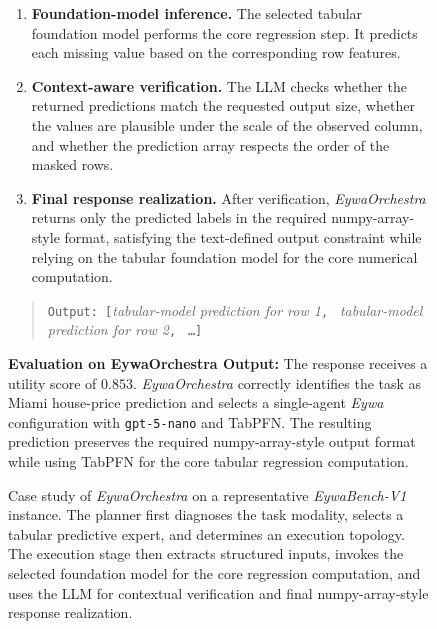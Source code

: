 \documentclass{llmxive}
\begin{document}
{\begin{figure}[!htbp]
{\begin{tcolorbox}[colback=gray!5!white, colframe=pink!90, 
title=Case Study B.1: EywaOrchestra Example 1, boxrule=0.3mm, width=1.2\textwidth, arc=2mm, auto outer arc=true]
\begin{enumerate}
    \item \textbf{Foundation-model inference.}
    The selected tabular foundation model performs the core regression step. It predicts each missing value based on the corresponding row features.

    \item \textbf{Context-aware verification.}
    The LLM checks whether the returned predictions match the requested output size, whether the values are plausible under the scale of the observed column, and whether the prediction array respects the order of the masked rows.

    \item \textbf{Final response realization.}
    After verification, \textit{EywaOrchestra} returns only the predicted labels in the required numpy-array-style format, satisfying the text-defined output constraint while relying on the tabular foundation model for the core numerical computation.
\end{enumerate}

\begin{quote}
\small
\texttt{Output: [}\textit{tabular-model prediction for row 1}\texttt{, }
\textit{tabular-model prediction for row 2}\texttt{, }
\texttt{\ldots}\texttt{]}
\end{quote}

\textbf{Evaluation on EywaOrchestra Output:}
The response receives a utility score of \(0.853\). \textit{EywaOrchestra} correctly identifies the task as Miami house-price prediction and selects a single-agent \textit{Eywa} configuration with \texttt{gpt-5-nano} and TabPFN. The resulting prediction preserves the required numpy-array-style output format while using TabPFN for the core tabular regression computation.


\end{tcolorbox}}
\caption{
Case study of \textit{EywaOrchestra} on a representative \textit{EywaBench-V1} instance. The planner first diagnoses the task modality, selects a tabular predictive expert, and determines an execution topology. The execution stage then extracts structured inputs, invokes the selected foundation model for the core regression computation, and uses the LLM for contextual verification and final numpy-array-style response realization.
}
\label{fig:case_study_eywaorchestra}
\end{figure}




















}
\end{document}
